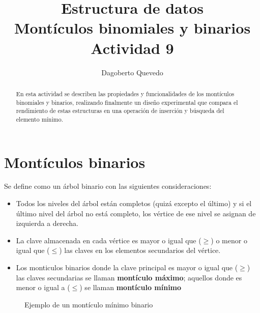 \documentclass[letterpaper,11pt]{article}
\begin{document}
\title{Estructura de datos\\\Large Montículos binomiales y binarios\\\small Actividad 9}
\author{Dagoberto Quevedo}
\maketitle

\begin{abstract}
En esta actividad se describen las propiedades y funcionalidades de los montículos binomiales y binarios, realizando finalmente un diseño experimental que compara el rendimiento de estas estructuras en una operación de inserción y búsqueda del elemento mínimo.
\end{abstract}

\section{Montículos binarios}

Se define como un árbol binario con las siguientes consideraciones:

\begin{itemize}
\item Todos los niveles del árbol están completos (quizá excepto el último) y si el último nivel del árbol no está completo, los vértice de ese nivel se asignan de izquierda a derecha.

\item La clave almacenada en cada vértice es mayor o igual que ($\geq$) o menor o igual que ($\leq$) las claves en los elementos secundarios del vértice.
\item Los monticulos binarios donde la clave principal es mayor o igual que ($\geq$) las claves secundarias se llaman \textbf{montículo máximo}; aquellos donde es menor o igual a ($\leq$) se llaman \textbf{montículo mínimo}
\end{itemize}

\begin{figure}[h]
 \centering
  \caption{Ejemplo de un montículo mínimo binario}
  \label{fig:bs}
\end{figure}
\end{document}
